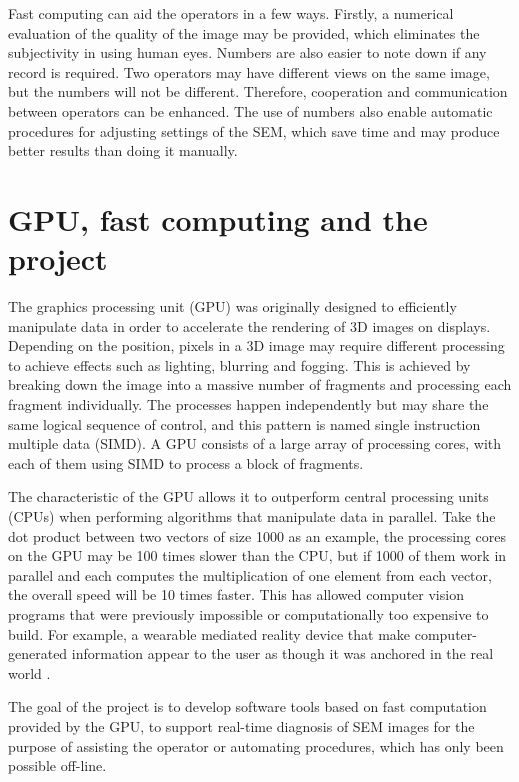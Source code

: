 \documentclass[conference]{IEEEtran}
\begin{document}
Fast computing can aid the operators in a few ways. Firstly, a numerical evaluation of the quality of the image may be provided, which eliminates the subjectivity in using human eyes. Numbers are also easier to note down if any record is required. Two operators may have different views on the same image, but the numbers will not be different. Therefore, cooperation and communication between operators can be enhanced. The use of numbers also enable automatic procedures for adjusting settings of the SEM, which save time and may produce better results than doing it manually.

\section{GPU, fast computing and the project}
The graphics processing unit (GPU) was originally designed to efficiently manipulate data in order to accelerate the rendering of 3D images on displays. Depending on the position, pixels in a 3D image may require different processing to achieve effects such as lighting, blurring and fogging. This is achieved by breaking down the image into a massive number of fragments and processing each fragment individually. The processes happen independently but may share the same logical sequence of control, and this pattern is named single instruction multiple data (SIMD). A GPU consists of a large array of processing cores, with each of them using SIMD to process a block of fragments.

The characteristic of the GPU allows it to outperform central processing units (CPUs) when performing algorithms that manipulate data in parallel. Take the dot product between two vectors of size 1000 as an example, the processing cores on the GPU may be 100 times slower than the CPU, but if 1000 of them work in parallel and each computes the multiplication of one element from each vector, the overall speed will be 10 times faster. This has allowed computer vision programs that were previously impossible or computationally too expensive to build. For example, a wearable mediated reality device that make computer-generated information appear to the user as though it was anchored in the real world \cite{Mediated reality using GPU}.

The goal of the project is to develop software tools based on fast computation provided by the GPU, to support real-time diagnosis of SEM images for the purpose of assisting the operator or automating procedures, which has only been possible off-line.
\end{document}
